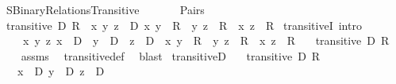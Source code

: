 %
\begin{isabellebody}%
%
%
\isadelimdocument
%
\endisadelimdocument
%
\isatagdocument
%
\isamarkuptrue%
%
\endisatagdocument
{\isafolddocument}%
%
\isadelimdocument
%
\endisadelimdocument
%
\isadelimtheory
%
\endisadelimtheory
%
\isatagtheory
{}\isamarkupfalse%
\ SBinary{\isacharunderscore}{\kern0pt}Relations{\isacharunderscore}{\kern0pt}Transitive\isanewline
\ \ \isanewline
\ \ \ \ Pairs\isanewline
{}%
\endisatagtheory
{\isafoldtheory}%
%
\isadelimtheory
\isanewline
%
\endisadelimtheory
\isanewline
{}\isamarkupfalse%
\ {\isachardoublequoteopen}transitive\ D\ R\ {\isasymequiv}\ {\isasymforall}x\ y\ z\ {\isasymin}\ D{\isachardot}{\kern0pt}\ {\isasymlangle}x{\isacharcomma}{\kern0pt}\ y{\isasymrangle}\ {\isasymin}\ R\ {\isasymand}\ {\isasymlangle}y{\isacharcomma}{\kern0pt}\ z{\isasymrangle}\ {\isasymin}\ R\ {\isasymlongrightarrow}\ {\isasymlangle}x{\isacharcomma}{\kern0pt}\ z{\isasymrangle}\ {\isasymin}\ R{\isachardoublequoteclose}\isanewline
\isanewline
{}\isamarkupfalse%
\ transitiveI\ {\isacharbrackleft}{\kern0pt}intro{\isacharbrackright}{\kern0pt}{\isacharcolon}{\kern0pt}\isanewline
\ \ \isanewline
\ \ \ \ {\isachardoublequoteopen}{\isasymAnd}x\ y\ z{\isachardot}{\kern0pt}\ x\ {\isasymin}\ D\ {\isasymLongrightarrow}\ y\ {\isasymin}\ D\ {\isasymLongrightarrow}\ z\ {\isasymin}\ D\ {\isasymLongrightarrow}\ {\isasymlangle}x{\isacharcomma}{\kern0pt}\ y{\isasymrangle}\ {\isasymin}\ R\ {\isasymLongrightarrow}\ {\isasymlangle}y{\isacharcomma}{\kern0pt}\ z{\isasymrangle}\ {\isasymin}\ R\ {\isasymLongrightarrow}\ {\isasymlangle}x{\isacharcomma}{\kern0pt}\ z{\isasymrangle}\ {\isasymin}\ R{\isachardoublequoteclose}\isanewline
\ \ \ {\isachardoublequoteopen}transitive\ D\ R{\isachardoublequoteclose}\isanewline
%
\isadelimproof
\ \ %
\endisadelimproof
%
\isatagproof
{}\isamarkupfalse%
\ assms\ \isamarkupfalse%
\ transitive{\isacharunderscore}{\kern0pt}def\ \isamarkupfalse%
\ blast%
\endisatagproof
{\isafoldproof}%
%
\isadelimproof
\isanewline
%
\endisadelimproof
\isanewline
{}\isamarkupfalse%
\ transitiveD{\isacharcolon}{\kern0pt}\isanewline
\ \ \ {\isachardoublequoteopen}transitive\ D\ R{\isachardoublequoteclose}\isanewline
\ \ \ {\isachardoublequoteopen}x\ {\isasymin}\ D{\isachardoublequoteclose}\ {\isachardoublequoteopen}y\ {\isasymin}\ D{\isachardoublequoteclose}\ {\isachardoublequoteopen}z\ {\isasymin}\ D{\isachardoublequoteclose}\isanewline

\end{isabellebody}
